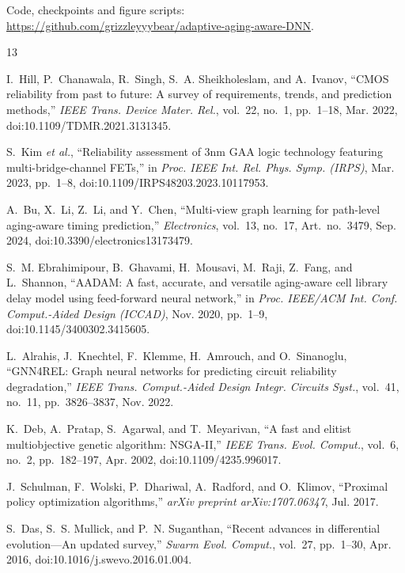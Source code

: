 \documentclass[conference]{IEEEtran}
\begin{document}
Code, checkpoints and figure scripts: \url{https://github.com/grizzleyyybear/adaptive-aging-aware-DNN}.


\begin{thebibliography}{13}

I.~Hill, P.~Chanawala, R.~Singh, S.~A. Sheikholeslam, and A.~Ivanov,
``CMOS reliability from past to future: A survey of requirements, trends, and prediction methods,''
\emph{IEEE Trans. Device Mater. Rel.}, vol.~22, no.~1, pp.~1--18, Mar. 2022, doi:10.1109/TDMR.2021.3131345.

S.~Kim \emph{et al.},
``Reliability assessment of 3nm GAA logic technology featuring multi-bridge-channel FETs,''
in \emph{Proc. IEEE Int. Rel. Phys. Symp. (IRPS)}, Mar. 2023, pp.~1--8, doi:10.1109/IRPS48203.2023.10117953.

A.~Bu, X.~Li, Z.~Li, and Y.~Chen,
``Multi-view graph learning for path-level aging-aware timing prediction,''
\emph{Electronics}, vol.~13, no.~17, Art.~no.~3479, Sep. 2024, doi:10.3390/electronics13173479.

S.~M. Ebrahimipour, B.~Ghavami, H.~Mousavi, M.~Raji, Z.~Fang, and L.~Shannon,
``AADAM: A fast, accurate, and versatile aging-aware cell library delay model using feed-forward neural network,''
in \emph{Proc. IEEE/ACM Int. Conf. Comput.-Aided Design (ICCAD)}, Nov. 2020, pp.~1--9, doi:10.1145/3400302.3415605.

L.~Alrahis, J.~Knechtel, F.~Klemme, H.~Amrouch, and O.~Sinanoglu,
``GNN4REL: Graph neural networks for predicting circuit reliability degradation,''
\emph{IEEE Trans. Comput.-Aided Design Integr. Circuits Syst.}, vol.~41, no.~11, pp.~3826--3837, Nov. 2022.

K.~Deb, A.~Pratap, S.~Agarwal, and T.~Meyarivan,
``A fast and elitist multiobjective genetic algorithm: NSGA-II,''
\emph{IEEE Trans. Evol. Comput.}, vol.~6, no.~2, pp.~182--197, Apr. 2002, doi:10.1109/4235.996017.

J.~Schulman, F.~Wolski, P.~Dhariwal, A.~Radford, and O.~Klimov,
``Proximal policy optimization algorithms,''
\emph{arXiv preprint arXiv:1707.06347}, Jul. 2017.

S.~Das, S.~S. Mullick, and P.~N. Suganthan,
``Recent advances in differential evolution---An updated survey,''
\emph{Swarm Evol. Comput.}, vol.~27, pp.~1--30, Apr. 2016, doi:10.1016/j.swevo.2016.01.004.


\end{thebibliography}
\end{document}
